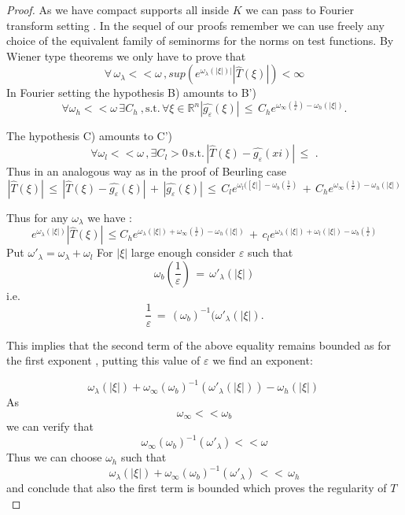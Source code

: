 \documentclass[12pt,a4paper]{amsart}
\newcommand{\RR}{\mathbb R}
\begin{document}
\begin{proof}
As we have compact supports all inside $K$ we can pass to Fourier transform setting . In the sequel of our proofs remember  we can use freely any choice of the equivalent family of seminorms for the norms on test functions. 
 By Wiener type theorems 
  we only have to prove that 
  $$\forall \,\omega_\lambda<<\omega\,,
  sup(e^{\omega_\lambda (|\xi|)|}|\hat{T}(\xi)|) < \infty
  $$
  In Fourier setting the hypothesis B)
  amounts to 
  B')$$ \forall \omega_h<<\omega\,\exists C_h \ ,
  \mbox{s.t.}\, \forall \xi\in \RR^n
  | \hat{g_\varepsilon}(\xi)|\,\leq \, 
  C_h e^{\omega_\infty(\frac{1}{\varepsilon})-
  \omega_h(|\xi|)}.
  $$
  
  
  The hypothesis C) amounts to 
  C')$$ \forall \omega_l << \omega \,,\exists C_l>0\,
  \mbox{s.t.}\,
  |\hat{T}(\xi)-\hat{g_\varepsilon}(xi)|\,\leq \,
\,.$$  Thus in an analogous way as in  the proof of Beurling case
  \begin{equation*}
  |\hat{T}(\xi)|\,\leq\,
  |\hat{T}(\xi)-\hat{g_\varepsilon}(\xi)|\,+\,
  |\hat{g_\varepsilon}(\xi)|\,\leq \,
  C_le^{\omega_l([\xi|]-\omega_b(\frac{1}{\varepsilon})}
  \,+\,C_h e^{\omega_\infty(\frac{1}{\varepsilon})-\omega_h(|\xi|)}
  \end{equation*}
  
  Thus for any $\omega_\lambda$ we have :
  \begin{equation*}
 e^{\omega_\lambda (|\xi|)} |\hat{T}(\xi)| \,\leq
  C_h e^{\omega_\lambda(|\xi|)+
  \omega_\infty(\frac{1}{\varepsilon})-
  \omega_h(|\xi|)} \,+\,
   c_le^{\omega_\lambda(|\xi|)  +   \omega_l(|\xi|)-\omega_b(\frac{1}{\varepsilon})}
   \end{equation*}
   Put $\omega'_\lambda = \omega_\lambda +\omega_l$
   For $|\xi|$ large enough consider $\varepsilon$ such that $$\omega_b(\frac{1}{\varepsilon})\,=\,\omega'_\lambda(|\xi|)$$ i.e.
   $$\frac{1}{\varepsilon}\,=\,
   (\omega_b)^{-1}(\omega'_\lambda(|\xi|).$$
   
   This implies that the second term of the above equality remains bounded 
   as for the first exponent , putting this value of $\varepsilon $ we find 
   an exponent:
   
$$  \omega_\lambda(|\xi|)+
  \omega_\infty(\omega_b)^{-1}(\omega'_\lambda(|\xi|))-
  \omega_h(|\xi|) \,$$
  As $$\omega_\infty << \omega_b$$ we can verify
  that $$\omega_\infty(\omega_b)^{-1}(\omega'_\lambda) <<
  \omega $$
   Thus we can choose $\omega_h$ such that 
    $$\omega_\lambda(|\xi|)+   \omega_\infty(\omega_b)^{-1}(\omega'_\lambda )\,<<\,\omega_h$$ and conclude that also the first term is bounded 
    which proves the regularity of $T$ 
    \end{proof}     
\end{document}
